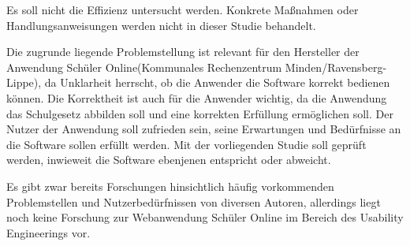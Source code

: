 Es soll nicht die Effizienz untersucht werden.
Konkrete Maßnahmen oder Handlungsanweisungen werden nicht in dieser Studie behandelt.

Die zugrunde liegende Problemstellung ist relevant für den Hersteller der Anwendung \glqq Schüler Online\grqq{}(\glqq Kommunales Rechenzentrum Minden/Ravensberg-Lippe\grqq{}), da Unklarheit herrscht, ob die Anwender die Software korrekt bedienen können. Die Korrektheit ist auch für die Anwender wichtig, da die Anwendung das Schulgesetz abbilden soll und eine korrekten Erfüllung ermöglichen soll. Der Nutzer der Anwendung soll zufrieden sein, seine Erwartungen und Bedürfnisse an die Software sollen erfüllt werden. Mit der vorliegenden Studie soll geprüft werden, inwieweit die Software ebenjenen entspricht oder abweicht.

Es gibt zwar bereits Forschungen hinsichtlich häufig vorkommenden Problemstellen und Nutzerbedürfnissen von diversen Autoren, 
allerdings liegt noch keine Forschung zur Webanwendung \glqq Schüler Online\grqq{} im Bereich des Usability Engineerings vor. 
